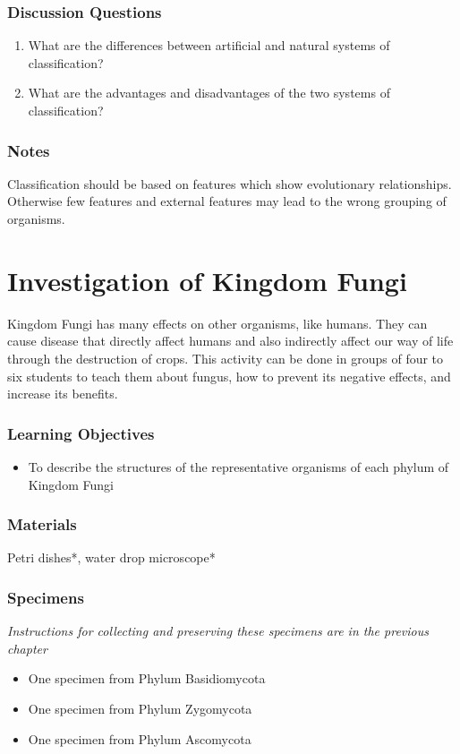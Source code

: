 \subsubsection*{Discussion Questions}
\begin{enumerate}
\item{What are the differences between artificial and natural systems of classification?}
\item{What are the advantages and disadvantages of the two systems of classification?}
\end{enumerate}

\subsubsection*{Notes}
Classification should be based on features which show evolutionary relationships. Otherwise few features and external features may lead to the wrong grouping of organisms.


\section{Investigation of Kingdom Fungi}
Kingdom Fungi has many effects on other organisms, like humans.  They can cause disease that directly affect humans and also indirectly affect our way of life through the destruction of crops.  This activity can be done in groups of four to six students to teach them about fungus, how to prevent its negative effects, and increase its benefits.

\subsubsection*{Learning Objectives}
\begin{itemize}
\item{To describe the structures of the representative organisms of each phylum of Kingdom Fungi}
\end{itemize}

\subsubsection*{Materials}
Petri dishes*, water drop microscope*

\subsubsection*{Specimens}
\textit{Instructions for collecting and preserving these specimens are in the previous chapter}
\begin{itemize}
\item{One specimen from Phylum Basidiomycota}
\item{One specimen from Phylum Zygomycota}
\item{One specimen from Phylum Ascomycota}
\end{itemize}

